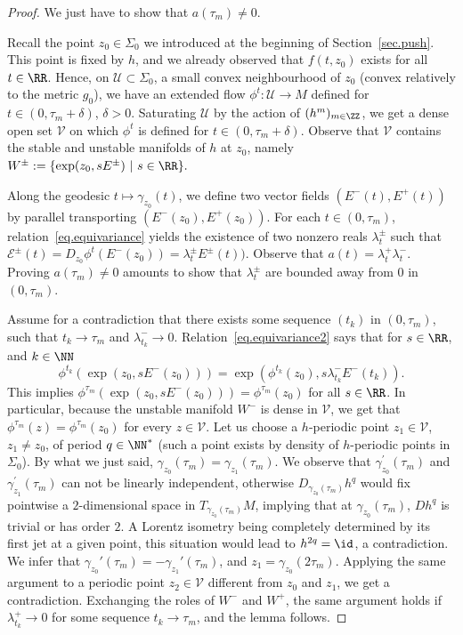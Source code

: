 \begin{proof}
We just have to show that $a(\tau_m) \not =0$.

Recall the point $z_0 \in {\Sigma}_0$ we introduced at the beginning of Section~\ref{sec.push}. This point is fixed by $h$, and we already observed that $f(t,z_0)$ exists for all $t \in \RR$. Hence, on ${\mathcal U} \subset {\Sigma}_0$, a small convex neighbourhood of $z_0$ (convex relatively to the metric $g_0$), we have an extended flow $\phi^t: {\mathcal U} \to M$ defined for $t \in (0,\tau_m+\delta)$, $\delta>0$. Saturating ${\mathcal U}$ by the action of $(h^m)_{m \in \ZZ}$, we get a dense open set ${\mathcal V}$ on which $\phi^t$ is defined for $t \in (0,\tau_m+\delta)$. Observe that ${\mathcal V}$ contains the stable and unstable manifolds of $h$ at $z_0$, namely $W^{\pm}:=\{ \exp(z_0,sE^{\pm}) \ | \ s \in \RR \}.$

Along the geodesic $t \mapsto \gamma_{z_0}(t)$, we define two vector fields $(E^-(t),E^+(t))$ by parallel transporting $(E^-(z_0),E^+(z_0))$. For each $t \in (0,\tau_m)$, relation~\eqref{eq.equivariance} yields the existence of two nonzero reals $\lambda_t^{\pm}$ such that ${\mathcal E}^{\pm}(t)=D_{z_0}\phi^t(E^-(z_0))=\lambda_t^{\pm}E^{\pm}(t))$. Observe that ${a}(t)=\lambda_t^+ \lambda_t^-$. Proving $a(\tau_m) \not =0$ amounts to show that $\lambda_t^{\pm}$ are bounded away from $0$ in $(0,\tau_m)$.

Assume for a contradiction that there exists some sequence $(t_k)$ in $(0,\tau_m)$, such that $t_k \to \tau_m$ and $\lambda_{t_k}^- \to 0$. Relation~\eqref{eq.equivariance2} says that for $s \in \RR$, and $k \in \NN$
\[
\phi^{t_k}(\exp(z_0,sE^{-}(z_0)))=\exp(\phi^{t_k}(z_0),s\lambda_{t_k}^-E^-(t_k)).
\]
This implies $\phi^{\tau_m}(\exp(z_0,sE^-(z_0)))=\phi^{\tau_m}(z_0)$ for all $s \in \RR$. In particular, because the unstable manifold $W^-$ is dense in ${\mathcal V}$, we get that $\phi^{\tau_m}(z)=\phi^{\tau_m}(z_0)$ for every $z \in {\mathcal V}$. Let us choose a $h$-periodic point $z_1 \in {\mathcal V}$, $z_1 \not = z_0$, of period $q \in \NN^*$ (such a point exists by density of $h$-periodic points in $\Sigma_0$). By what we just said, $\gamma_{z_0}(\tau_m)=\gamma_{z_1}(\tau_m)$. We observe that $\gamma_{z_0}^{\prime}(\tau_m)$ and $\gamma_{z_1}^{\prime}(\tau_m)$ can not be linearly independent, otherwise $D_{\gamma_{z_0}(\tau_m)}h^q$ would fix pointwise a $2$-dimensional space in $T_{\gamma_{z_0}(\tau_m)}M$, implying that at $\gamma_{z_0}(\tau_m)$, $Dh^q$ is trivial or has order $2$. A Lorentz isometry being completely determined by its first jet at a given point, this situation would lead to $h^{2q}=\id$, a contradiction. We infer that $\gamma_{z_0}'(\tau_m)=-\gamma_{z_1}'(\tau_m)$, and $z_1=\gamma_{z_0}(2 \tau_m)$. Applying the same argument to a periodic point $z_2 \in {\mathcal V}$ different from $z_0$ and $z_1$, we get a contradiction. Exchanging the roles of $W^-$ and $W^+$, the same argument holds if $\lambda_{t_k}^+ \to 0$ for some sequence $t_k \to \tau_m$, and the lemma follows.
\end{proof}

